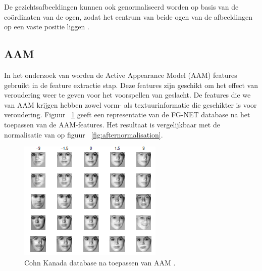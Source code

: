 De gezichtsafbeeldingen kunnen ook genormaliseerd worden op basis van de coördinaten van de ogen, zodat het centrum van beide ogen van de afbeeldingen op een vaste positie liggen \autocite{Chen2011}. 

\subsection{AAM}\label{sub:aam}
In het onderzoek van \textcite{Lakshmiprabha2016} worden de Active Appearance Model (AAM) features gebruikt in de feature extractie stap. Deze features zijn geschikt om het effect van veroudering weer te geven voor het voorspellen van geslacht. De features die we van AAM krijgen hebben zowel vorm- als textuurinformatie die geschikter is voor veroudering. Figuur {~\ref{fig:aam}} geeft een representatie van de FG-NET database na het toepassen van de AAM-features. Het resultaat is vergelijkbaar met de normalisatie van \textcite{Chen2011} op figuur {~\ref{fig:afternormalisation}}.
\begin{figure}
    \centering
    \includegraphics{graphics/AAM.PNG}
    \caption[AAM-features]{\label{fig:aam}Cohn Kanada database na toepassen van AAM \autocite{Lakshmiprabha2016}.}
\end{figure} 

